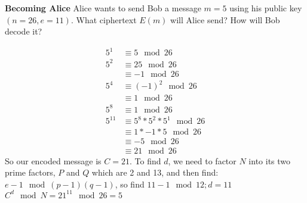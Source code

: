 \item \textbf{Becoming Alice}\newline
Alice wants to send Bob a message $m = 5$ using his public key $(n = 26, e = 11)$. What ciphertext $E(m)$ will Alice send? How will Bob decode it?
\begin{solution}
\begin{equation}
\begin{split}
5^1 	&\equiv 5 \mod 26 \\
5^2 	&\equiv 25 \mod 26 \\
	&\equiv -1 \mod 26 \\
5^4	&\equiv (-1)^2 \mod 26 \\
	&\equiv 1 \mod 26 \\
5^8 &	\equiv 1 \mod 26 \\
5^{11}	&\equiv 5^8 * 5^2 * 5^1 \mod 26 \\
	&\equiv 1 * -1 * 5 \mod 26 \\
	&\equiv -5 \mod 26 \\
	&\equiv 21 \mod 26
\end{split}
\end{equation}
So our encoded message is $C = 21$. To find $d$, we need to factor $N$ into its two prime factors, $P$ and $Q$ which are 2 and 13, and then find: 
$e-1 \mod (p-1)(q-1)$, so find $11-1 \mod 12; d = 11$
     $C^d \mod N = 21^{11} \mod 26 = 5$
\end{solution}